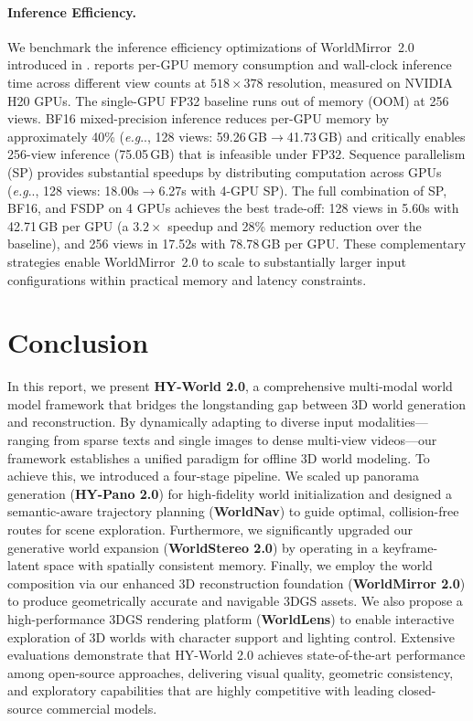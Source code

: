 \documentclass{article} %
\makeatletter
\DeclareRobustCommand\onedot{\futurelet\@let@token\@onedot}
\def\@onedot{\ifx\@let@token.\else.\null\fi\xspace}
\def\eg{\emph{e.g}\onedot} \def\Eg{\emph{E.g}\onedot}
\makeatother
\begin{document}
\paragraph{Inference Efficiency.}
\label{sec:infer_efficiency_exp}
We benchmark the inference efficiency optimizations of WorldMirror~2.0 introduced in .  reports per-GPU memory consumption and wall-clock inference time across different view counts at $518\!\times\!378$ resolution, measured on NVIDIA H20 GPUs. The single-GPU FP32 baseline runs out of memory (OOM) at 256 views. BF16 mixed-precision inference reduces per-GPU memory by approximately 40\% (\eg, 128 views: 59.26\,GB$\to$41.73\,GB) and critically enables 256-view inference (75.05\,GB) that is infeasible under FP32. Sequence parallelism (SP) provides substantial speedups by distributing computation across GPUs (\eg, 128 views: 18.00s$\to$6.27s with 4-GPU SP). The full combination of SP, BF16, and FSDP on 4 GPUs achieves the best trade-off: 128 views in 5.60s with 42.71\,GB per GPU (a $3.2\times$ speedup and 28\% memory reduction over the baseline), and 256 views in 17.52s with 78.78\,GB per GPU. These complementary strategies enable WorldMirror~2.0 to scale to substantially larger input configurations within practical memory and latency constraints.
 

\section{Conclusion}

In this report, we present \textbf{HY-World 2.0}, a comprehensive multi-modal world model framework that bridges the longstanding gap between 3D world generation and reconstruction. By dynamically adapting to diverse input modalities---ranging from sparse texts and single images to dense multi-view videos---our framework establishes a unified paradigm for offline 3D world modeling.
To achieve this, we introduced a four-stage pipeline. We scaled up panorama generation (\textbf{HY-Pano 2.0}) for high-fidelity world initialization and designed a semantic-aware trajectory planning (\textbf{WorldNav}) to guide optimal, collision-free routes for scene exploration. 
Furthermore, we significantly upgraded our generative world expansion (\textbf{WorldStereo 2.0}) by operating in a keyframe-latent space with spatially consistent memory.
Finally, we employ the world composition via our enhanced 3D reconstruction foundation (\textbf{WorldMirror 2.0}) to produce geometrically accurate and navigable 3DGS assets. We also propose a high-performance 3DGS rendering platform (\textbf{WorldLens}) to enable interactive exploration of 3D worlds with character support and lighting control.
Extensive evaluations demonstrate that HY-World 2.0 achieves state-of-the-art performance among open-source approaches, delivering visual quality, geometric consistency, and exploratory capabilities that are highly competitive with leading closed-source commercial models. 
\end{document}
